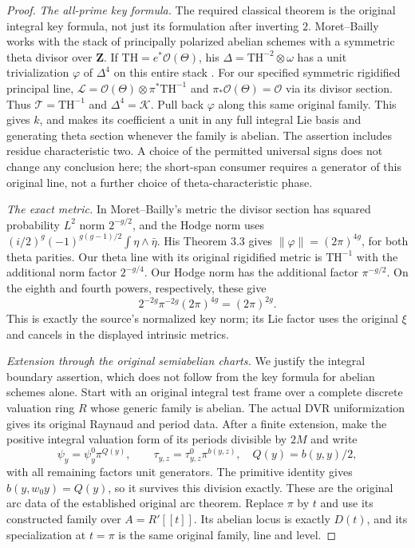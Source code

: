 \begin{proof}
\emph{The all-prime key formula.}
The required classical theorem is the original integral key formula,
not just its formulation after inverting $2$.
Moret--Bailly works with the stack of principally polarized abelian
schemes with a symmetric theta divisor over $\mathbf Z$.
If $\mathrm{TH}=e^*\mathcal O(\Theta)$, his
$\Delta=\mathrm{TH}^{-2}\otimes\omega$ has a unit trivialization
$\varphi$ of $\Delta^4$ on this entire stack
\cite[\S0.1 and Theorem 0.2]{theta-key-moret-bailly}.
For our specified symmetric rigidified principal line,
$\mathscr L=\mathcal O(\Theta)\otimes\pi^*\mathrm{TH}^{-1}$
and $\pi_*\mathcal O(\Theta)=\mathcal O$ via its divisor section.
Thus $\mathcal T=\mathrm{TH}^{-1}$ and $\Delta^4=\mathcal K$.
Pull back $\varphi$ along this same original family.  This gives
$k$, and makes its coefficient a unit in any full integral Lie
basis and generating theta section whenever the family is abelian.
The assertion includes residue characteristic two.  A choice of the
permitted universal signs does not change any conclusion here;
the short-span consumer requires a generator of this original line,
not a further choice of theta-characteristic phase.

\emph{The exact metric.}
In Moret--Bailly's metric the divisor section has squared probability
$L^2$ norm $2^{-g/2}$, and the Hodge norm uses
$ (i/2)^g(-1)^{g(g-1)/2}\int\eta\wedge\bar\eta$.
His Theorem 3.3 gives $\|\varphi\|=(2\pi)^{4g}$, for both
theta parities.  Our theta line with its original rigidified metric
is $\mathrm{TH}^{-1}$ with the additional norm factor $2^{-g/4}$.
Our Hodge norm has the additional factor $\pi^{-g/2}$.
On the eighth and fourth powers, respectively, these give
\[
        2^{-2g}\pi^{-2g}(2\pi)^{4g}=(2\pi)^{2g}.
\]
This is exactly the source's normalized key norm; its Lie factor
uses the original $\xi$ and cancels in the displayed intrinsic
metrics\cite{theta-key-source}.

\emph{Extension through the original semiabelian charts.}
We justify the integral boundary assertion, which does not follow
from the key formula for abelian schemes alone.  Start with an
original integral test frame over a complete discrete valuation
ring $R$ whose generic family is abelian.  The actual DVR
uniformization gives its original Raynaud and period data.
After a finite extension, make the positive integral valuation
form of its periods divisible by $2M$ and write
\[
        \psi_y=\psi_y^0\pi^{Q(y)},\qquad
        \tau_{y,z}=\tau_{y,z}^0\pi^{b(y,z)},
        \quad Q(y)=b(y,y)/2,
\]
with all remaining factors unit generators.  The primitive identity
gives $b(y,w_0y)=Q(y)$, so it survives this division exactly.
These are the original arc data of
the established original arc theorem\cite{current-construction-record}.  Replace $\pi$ by $t$ and use
its constructed family over $A=R'[[t]]$.  Its abelian locus is
exactly $D(t)$, and its specialization at $t=\pi$ is the same
original family, line and level.


\end{proof}
